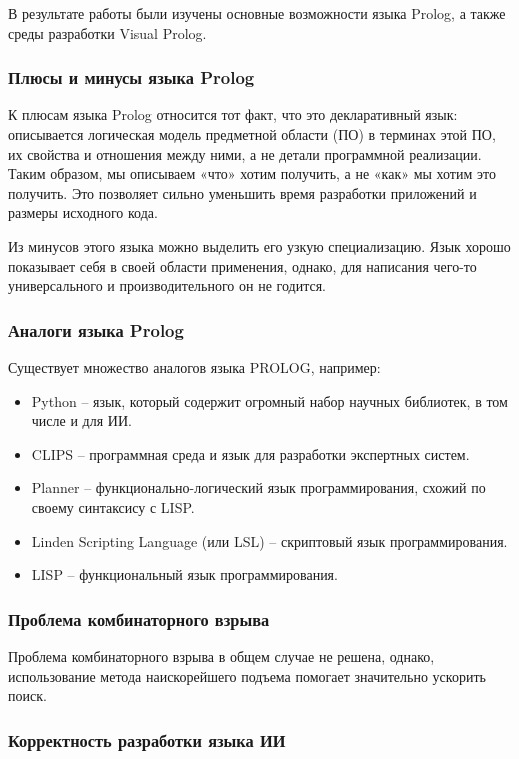 \documentclass[14pt,a4paper,report]{report}
\begin{document}
В результате работы были изучены основные возможности языка Prolog, а также среды разработки Visual Prolog.

\subsubsection{Плюсы и минусы языка Prolog}

К плюсам языка Prolog относится тот факт, что это декларативный язык: описывается логическая модель предметной области (ПО) в терминах этой ПО, их свойства и отношения между ними, а не детали программной реализации. Таким образом, мы описываем «что» хотим получить, а не «как» мы хотим это получить. Это позволяет сильно уменьшить время разработки приложений и размеры исходного кода.

Из минусов этого языка можно выделить его узкую специализацию. Язык хорошо показывает себя в своей области применения, однако, для написания чего-то универсального и производительного он не годится.

\subsubsection{Аналоги языка Prolog}

Существует множество аналогов языка PROLOG, например:

\begin{itemize}
	\item Python -- язык, который содержит огромный набор научных библиотек, в том числе и для ИИ.
	\item CLIPS -- программная среда и язык для разработки экспертных систем.
	\item Planner -- функционально-логический язык программирования, схожий по своему синтаксису с LISP.
	\item Linden Scripting Language (или LSL) -- скриптовый язык программирования.
	\item LISP -- функциональный язык программирования.
\end{itemize}

\subsubsection{Проблема комбинаторного взрыва}

Проблема комбинаторного взрыва в общем случае не решена, однако, использование метода наискорейшего подъема помогает значительно ускорить поиск.

\subsubsection{Корректность разработки языка ИИ}
\end{document}
